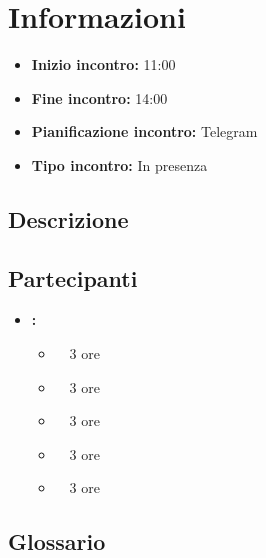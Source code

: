 \section{Informazioni}
\begin{itemize}
	\item \textbf{Inizio incontro:} 11:00
	\item \textbf{Fine incontro:} 14:00
	\item \textbf{Pianificazione incontro:} Telegram
	\item \textbf{Tipo incontro:} In presenza
\end{itemize}

\subsection{Descrizione}
\DocDescription

\subsection{Partecipanti}

\begin{itemize}
	\item \textbf{\GroupName:}
	\begin{itemize}
		\item \tommaso \ \rightarrow\ 3 ore
		\item \riccardo \ \rightarrow\ 3 ore
		\item \raul \ \rightarrow\ 3 ore
		\item \martina \ \rightarrow\ 3 ore
		\item \sebastiano \ \rightarrow\ 3 ore
	\end{itemize}
\end{itemize}

\subsection{Glossario}
\GlossarioIntroduzione

\clearpage